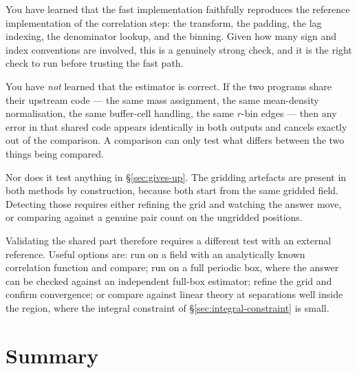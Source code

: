 \documentclass[12pt]{article}
\begin{document}
You have learned that the fast implementation faithfully reproduces the
reference implementation of the correlation step: the transform, the padding,
the lag indexing, the denominator lookup, and the binning.  Given how many
sign and index conventions are involved, this is a genuinely strong check,
and it is the right check to run before trusting the fast path.

You have \emph{not} learned that the estimator is correct.  If the two
programs share their upstream code --- the same mass assignment, the same
mean-density normalisation, the same buffer-cell handling, the same $r$-bin
edges --- then any error in that shared code appears identically in both
outputs and cancels exactly out of the comparison.  A comparison can only test
what differs between the two things being compared.

Nor does it test anything in \S\ref{sec:gives-up}.  The gridding artefacts are
present in both methods by construction, because both start from the same
gridded field.  Detecting those requires either refining the grid and watching
the answer move, or comparing against a genuine pair count on the ungridded
positions.

Validating the shared part therefore requires a different test with an
external reference.  Useful options are: run on a field with an analytically
known correlation function and compare; run on a full periodic box, where the
answer can be checked against an independent full-box estimator; refine the
grid and confirm convergence; or compare against linear theory at separations
well inside the region, where the integral constraint of
\S\ref{sec:integral-constraint} is small.

\section{Summary}
\end{document}
